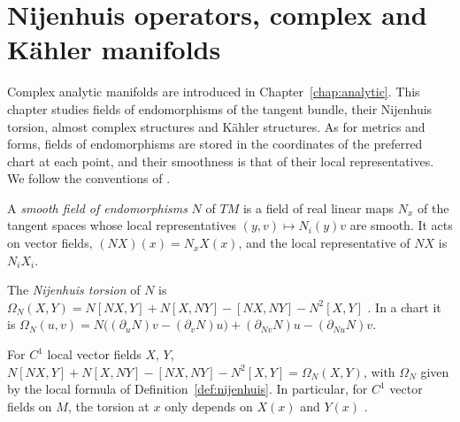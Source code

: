 \chapter{Nijenhuis operators, complex and Kähler manifolds}
\label{chap:complex}

Complex analytic manifolds are introduced in Chapter~\ref{chap:analytic}. This chapter studies
fields of endomorphisms of the tangent bundle, their Nijenhuis torsion, almost complex structures
and Kähler structures. As for metrics and forms, fields of endomorphisms are stored in the
coordinates of the preferred chart at each point, and their smoothness is that of their local
representatives. We follow the conventions of \cite{GLT}.

\begin{definition}
  \label{def:end-field}
  \leanok
  A \emph{smooth field of endomorphisms} $N$ of $TM$ is a field of real linear maps $N_x$ of the
  tangent spaces whose local representatives $(y, v) \mapsto N_i(y) v$ are smooth. It acts on
  vector fields, $(NX)(x) = N_x X(x)$, and the local representative of $NX$ is $N_i X_i$.
\end{definition}

\begin{definition}
  \label{def:nijenhuis}
  \leanok
  The \emph{Nijenhuis torsion} of $N$ is
  $\Omega_N(X, Y) = N[NX, Y] + N[X, NY] - [NX, NY] - N^2[X, Y]$ \cite[Definition 3.1]{GLT}. In
  a chart it is
  $\Omega_N(u, v) = N\big((\partial_u N) v - (\partial_v N) u\big) + (\partial_{Nv} N) u -
  (\partial_{Nu} N) v$.
\end{definition}

\begin{theorem}
  \label{thm:nijenhuis-bracket}
  \leanok
  For $C^1$ local vector fields $X$, $Y$,
  $N[NX, Y] + N[X, NY] - [NX, NY] - N^2[X, Y] = \Omega_N(X, Y)$, with $\Omega_N$ given by the
  local formula of Definition~\ref{def:nijenhuis}. In particular, for $C^1$ vector fields on $M$,
  the torsion at $x$ only depends on $X(x)$ and $Y(x)$ \cite[Theorem 3.2]{GLT}.
\end{theorem}

